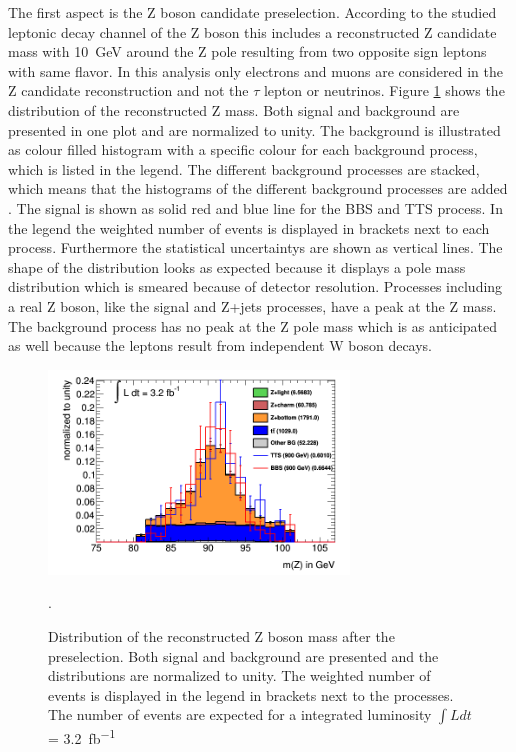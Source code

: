 The first aspect is the Z boson candidate preselection. 
According to the studied leptonic decay channel of the Z boson this includes a reconstructed Z candidate mass with \SI{10}{GeV} around the Z pole resulting from two opposite sign leptons with same flavor.
In this analysis only electrons and muons are considered in the Z candidate reconstruction and not the $\tau$ lepton or neutrinos.
Figure \ref{Zmass} shows the distribution of the reconstructed Z mass. 
Both signal and background are presented in one plot and are normalized to unity. 
The background is illustrated as colour filled histogram with a specific colour for each background process, which is listed in the legend.
The different background processes are stacked, which means that the histograms of the different background processes are added . 
The signal is shown as solid red and blue line for the BBS and TTS process.
In the legend the weighted number of events is displayed in brackets next to each process.
Furthermore the statistical uncertaintys are shown as vertical lines.
The shape of the distribution looks as expected because it displays a pole mass distribution which is smeared because of detector resolution.
Processes including a real Z boson, like the signal and Z+jets processes, have a peak at the Z mass. 
The \ttbar{} background process has no peak at the Z pole mass which is as anticipated as well because the leptons result from independent W boson decays.\\

\begin{figure}
\centering
\includegraphics[width=8cm]{figures/Zmass.png}
\caption{Distribution of the reconstructed Z boson mass after the preselection. 
Both signal and background are presented and the distributions are normalized to unity.
The weighted number of events is displayed in the legend in brackets next to the processes. 
The number of events are expected for a integrated luminosity $\int{Ldt}$ = \SI{3,2}{fb^{-1}} }.
\label{Zmass}
\end{figure}

